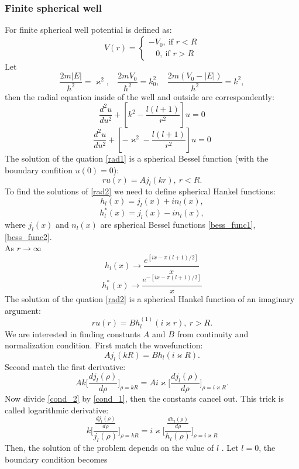 \documentclass[a4paper, 12pt]{article}
\begin{document}
\subsubsection{Finite spherical well}
For finite spherical well  potential is defined as:
$$V(r)=\begin{cases}
-V_0, ~\text{if } r< R\\
~~~~0, ~\text{if } r>R
\end{cases}$$
Let
$$\frac{2m|E|}{\hbar^2} = \varkappa^2, ~~~~\frac{2m V_0}{\hbar^2}=k_0^2, ~~~~\frac{2m(V_0-|E|)}{\hbar^2} =k^2,$$
then the radial equation inside of the well and outside are correspondently:
\begin{equation}\label{rad1}
	\frac{d^2 u}{du^2}+[k^2-\frac{l(l+1)}{r^2}]u=0
\end{equation}
\begin{equation}\label{rad2}
	\frac{d^2 u}{du^2}+[-\varkappa^2-\frac{l(l+1)}{r^2}]u=0
\end{equation}
The solution of the quation \eqref{rad1} is a spherical Bessel function (with the boundary confition $u(0) =0$):
$$r u(r) =A j_l(kr), ~r< R.$$
To find the solutions of \eqref{rad2} we need to define spherical Hankel functions:
$$h_l(x) = j_l(x)+in_l(x),$$
$$h_l^*(x)=j_l(x)-in_l(x),$$
where $j_l(x)$ and $n_l(x)$ are spherical Bessel functions \eqref{bess_func1}, \eqref{bess_func2}.\\
As $r \to \infty$
$$h_l(x) \to \frac{e^{[ix-\pi (l+1)/2]}}{x}$$
$$h_l^*(x) \to \frac{e^{-[ix-\pi (l+1)/2]}}{x}$$
The solution of the quation \eqref{rad2} is a spherical Hankel function of an imaginary argument:
$$r u(r) = B h_l^{(1)}(i \varkappa r), ~r>R.$$
We are interested in finding constants $A$ and $B$ from continuity and normalization condition. First match the wavefunction:
\begin{equation}\label{cond_1}
	A j_l(kR)=B h_l(i \varkappa R).
\end{equation}
Second match the first derivative:
\begin{equation}\label{cond_2}
	A k \bigg[\frac{d j_l(\rho)}{d\rho}\bigg]_{\rho = kR} = A i \varkappa \bigg[\frac{d j_l(\rho)}{d\rho}\bigg]_{\rho = i \varkappa R}.
\end{equation}
Now divide \eqref{cond_2} by \eqref{cond_1}, then the constants cancel out. This trick is called logarithmic derivative:
$$k\bigg[ \frac{\frac{d j_l(\rho)}{d \rho}}{j_l(\rho)} \bigg]_{\rho = kR} = i\varkappa \bigg[ \frac{\frac{d h_l(\rho)}{d \rho}}{h_l(\rho)} \bigg]_{\rho = i \varkappa R} $$
 Then, the solution of the problem depends on the value of $l$ . Let $l=0$, the boundary condition becomes
\end{document}
